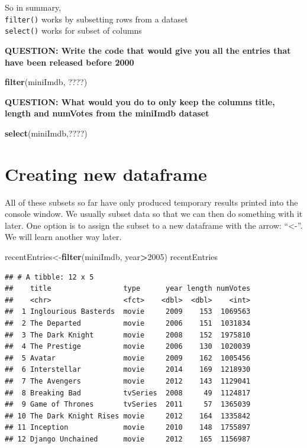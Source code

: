 \documentclass[]{book}
\newenvironment{Shaded}{\begin{snugshade}}{\end{snugshade}}
\newcommand{\DecValTok}[1]{\textcolor[rgb]{0.00,0.00,0.81}{#1}}
\newcommand{\KeywordTok}[1]{\textcolor[rgb]{0.13,0.29,0.53}{\textbf{#1}}}
\newcommand{\NormalTok}[1]{#1}
\newcommand{\OperatorTok}[1]{\textcolor[rgb]{0.81,0.36,0.00}{\textbf{#1}}}
\begin{document}
So in summary,\\
\texttt{filter()} works by subsetting rows from a dataset\\
\texttt{select()} works for subset of columns

\textbf{QUESTION: Write the code that would give you all the entries that have been released before 2000}

\begin{Shaded}
\begin{Highlighting}[]
\KeywordTok{filter}\NormalTok{(miniImdb, ????)}
\end{Highlighting}
\end{Shaded}

\textbf{QUESTION: What would you do to only keep the columns title, length and numVotes from the miniImdb dataset}

\begin{Shaded}
\begin{Highlighting}[]
\KeywordTok{select}\NormalTok{(miniImdb,????)}
\end{Highlighting}
\end{Shaded}

\hypertarget{creating-new-dataframe}{%
\section{Creating new dataframe}\label{creating-new-dataframe}}

All of these subsets so far have only produced temporary results printed into the console window. We usually subset data so that we can then do something with it later. One option is to assign the subset to a new dataframe with the arrow: ``\textless{}-''. We will learn another way later.

\begin{Shaded}
\begin{Highlighting}[]
\NormalTok{recentEntries<-}\KeywordTok{filter}\NormalTok{(miniImdb, year}\OperatorTok{>}\DecValTok{2005}\NormalTok{)}
\NormalTok{recentEntries}
\end{Highlighting}
\end{Shaded}

\begin{verbatim}
## # A tibble: 12 x 5
##    title                 type      year length numVotes
##    <chr>                 <fct>    <dbl>  <dbl>    <int>
##  1 Inglourious Basterds  movie     2009    153  1069563
##  2 The Departed          movie     2006    151  1031834
##  3 The Dark Knight       movie     2008    152  1975810
##  4 The Prestige          movie     2006    130  1020039
##  5 Avatar                movie     2009    162  1005456
##  6 Interstellar          movie     2014    169  1218930
##  7 The Avengers          movie     2012    143  1129041
##  8 Breaking Bad          tvSeries  2008     49  1124817
##  9 Game of Thrones       tvSeries  2011     57  1365039
## 10 The Dark Knight Rises movie     2012    164  1335842
## 11 Inception             movie     2010    148  1755897
## 12 Django Unchained      movie     2012    165  1156987
\end{verbatim}
\end{document}
